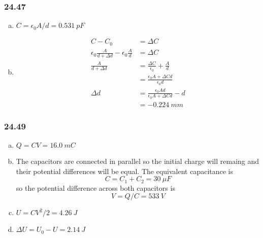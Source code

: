 \documentclass{article}
\begin{document}
\subsubsection{24.47}

\begin{enumerate}[(a)]
  \item $C = \epsilon_0 A / d = \qty{0.531}{pF}$

  \item

        \begin{align*}
          C - C_0                                                    & = \Delta C                                             \\
          \epsilon_0 \frac{A}{d + \Delta d} - \epsilon_0 \frac{A}{d} & = \Delta C                                             \\
          \frac{A}{d + \Delta d}                                     & = \frac{\Delta C}{\epsilon_0} + \frac{A}{d}            \\
                                                                     & = \frac{\epsilon_0 A + \Delta C d}{\epsilon_0 d}       \\
          \Delta d                                                   & = \frac{\epsilon_0 A d}{\epsilon_0 A + \Delta C d} - d \\
                                                                     & = \qty{-0.224}{mm}
        \end{align*}
\end{enumerate}

\subsubsection{24.49}

\begin{enumerate}[(a)]
  \item $Q = C V = \qty{16.0}{mC}$

  \item The capacitors are connected in parallel so the initial charge will remaing and their potential differences will be equal. The equivalent capacitance is \[C = C_1 + C_2 = \qty{30}{\mu F}\] so the potential difference across both capacitors is \[V = Q / C = \qty{533}{V}\]

  \item $U = C V^2 / 2 = \qty{4.26}{J}$

  \item $\Delta U = U_0 - U = \qty{2.14}{J}$
\end{enumerate}
\end{document}
